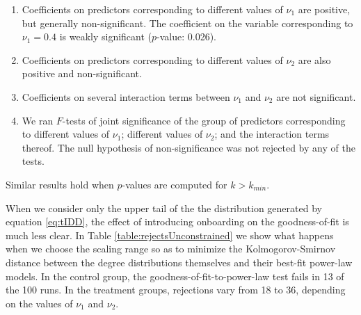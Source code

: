 \documentclass{bmcart}
\begin{document}
\begin{enumerate}
\item Coefficients on predictors corresponding to different values of $\nu_1$ are positive, but generally non-significant. The coefficient on the variable corresponding to $\nu_1 = 0.4$ is weakly significant ($p$-value: 0.026).
\item Coefficients on predictors corresponding to different values of $\nu_2$ are also  positive and non-significant. 
\item Coefficients on several interaction terms between $\nu_1$ and $\nu_2$ are not significant. 
\item We ran $F$-tests of joint significance of the group of predictors corresponding to different values of $\nu_1$; different values of $\nu_2$; and the interaction terms thereof. The null hypothesis of non-significance was not rejected by any of the tests. 
\end{enumerate}

Similar results hold when $p$-values are computed for $k > k_{min}$. 

When we consider only the upper tail of the the distribution generated by equation \ref{eq:tIDD}, the effect of introducing onboarding on the goodness-of-fit is much less clear. In Table \ref{table:rejectsUnconstrained} we show what happens when we choose the scaling range so as to minimize the Kolmogorov-Smirnov distance between the degree distributions themselves and their best-fit power-law models. In the control group, the goodness-of-fit-to-power-law test fails in 13 of the 100 runs. In the treatment groups, rejections vary from 18 to 36, depending on the values of $\nu_1$ and $\nu_2$.  
\end{document}
